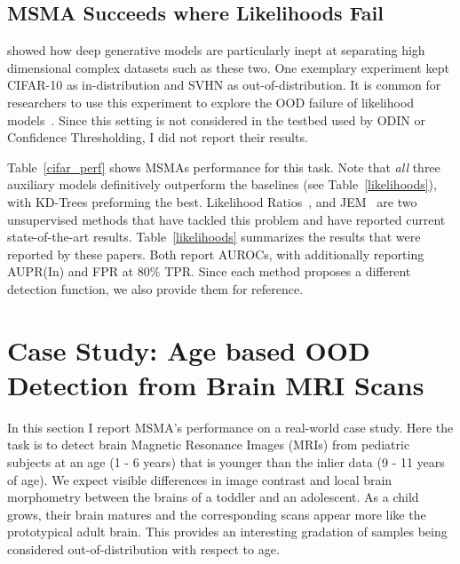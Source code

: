 \subsection*{MSMA Succeeds where Likelihoods Fail}

\cite{nalisnick2018do} showed how deep generative models are particularly inept at separating high dimensional complex datasets such as these two. One exemplary experiment kept CIFAR-10 as in-distribution and SVHN as out-of-distribution. It is common for researchers to use this experiment to explore the OOD failure of likelihood models~\cite{why_norm_fails,Ren2019,Grathwohl2020Your}. Since this setting is not considered in the testbed used by ODIN or Confidence Thresholding, I did not report their results. 

Table~\ref{cifar_perf} shows MSMAs performance for this task. Note that \textit{all} three auxiliary models definitively outperform the baselines (see Table~\ref{likelihoods}), with KD-Trees preforming the best. Likelihood Ratios~\cite{Ren2019}, and JEM~\cite{Grathwohl2020Your} are two unsupervised methods that have tackled this problem and have reported current state-of-the-art results. Table~\ref{likelihoods} summarizes the results that were reported by these papers. Both report AUROCs, with \cite{Ren2019} additionally reporting AUPR(In) and FPR at 80\% TPR. Since each method proposes a different detection function, we also provide them for reference.
\goodbreak

\section{Case Study: Age based OOD Detection from Brain MRI Scans}
\label{brain_experiment}

In this section I report MSMA's performance on a real-world case study. Here the task is to detect brain Magnetic Resonance Images (MRIs) from pediatric subjects at an age (1 - 6 years) that is younger than the inlier data (9 - 11 years of age). We expect visible differences in image contrast and local brain morphometry between the brains of a toddler and an adolescent. As a child grows, their brain matures and the corresponding scans appear more like the prototypical adult brain. This provides an interesting gradation of samples being considered out-of-distribution with respect to age.

